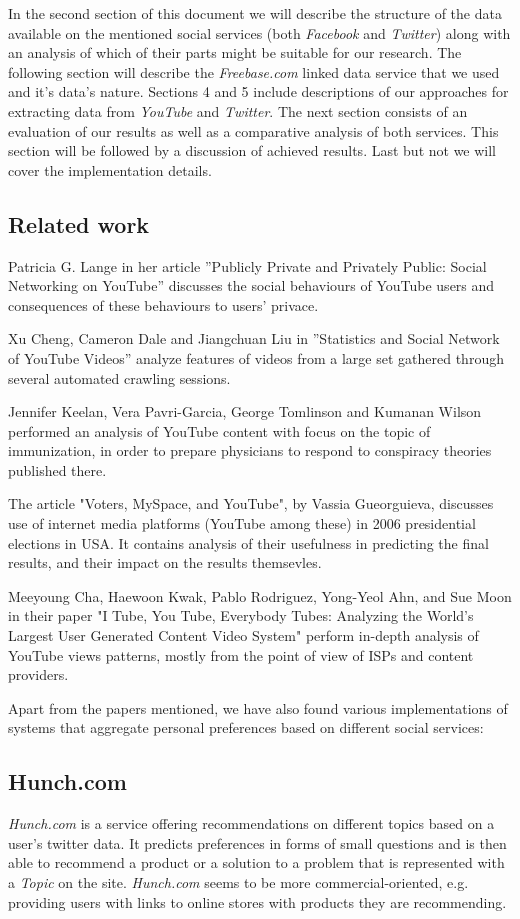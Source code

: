 In the second section of this document we will describe the structure of the data available on the mentioned social services (both \textit{Facebook} and \textit{Twitter}) along with an analysis of which of their parts might be suitable for our research. The following section will describe the \textit{Freebase.com} linked data service that we used and it's data's nature. Sections 4 and 5 include descriptions of our approaches for extracting data from \textit{YouTube} and \textit{Twitter}. The next section consists of an evaluation of our results as well as a comparative analysis of both services. This section will be followed by a discussion of achieved results. Last but not we will cover the implementation details.

\subsection{Related work}
Patricia G. Lange in her article ''Publicly Private and Privately Public: Social
Networking on YouTube'' discusses the social behaviours of YouTube users and
consequences of these behaviours to users' privace.

Xu Cheng, Cameron Dale and Jiangchuan Liu in ''Statistics and Social Network of
YouTube Videos'' analyze features of videos from a large set gathered through
several automated crawling sessions.

Jennifer Keelan, Vera Pavri-Garcia, George Tomlinson and Kumanan Wilson
performed an analysis of YouTube content with focus on the topic of
immunization, in order to prepare physicians to respond to conspiracy theories
published there.

The article "Voters, MySpace, and YouTube", by Vassia Gueorguieva, discusses use
of internet media platforms (YouTube among these) in 2006 presidential elections
in USA. It contains analysis of their usefulness in predicting the final
results, and their impact on the results themsevles.

Meeyoung Cha, Haewoon Kwak, Pablo Rodriguez, Yong-Yeol Ahn, and Sue Moon in
their paper "I Tube, You Tube, Everybody Tubes: Analyzing the World’s Largest
User Generated Content Video System" perform in-depth analysis of YouTube views
patterns, mostly from the point of view of ISPs and content providers.

Apart from the papers mentioned, we have also found various implementations of systems that aggregate personal preferences based on different
social services:

\subsection{Hunch.com}
\textit{Hunch.com} is a service offering recommendations on different topics based on a user's twitter data. It predicts preferences in forms of small questions and is then able to recommend a product or a solution to a problem that is represented with a \textit{Topic} on the site. \textit{Hunch.com} seems to be more commercial-oriented, e.g. providing users with links to online stores with products they are recommending.

